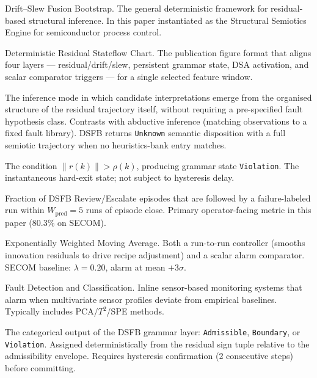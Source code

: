 \documentclass[11pt,letterpaper]{article}
\theoremstyle{scresult}
\begin{document}
\begin{description}[leftmargin=2.4cm, labelwidth=2.2cm, style=nextline,
                    itemsep=4pt, parsep=0pt]
\item[\textbf{DSFB}]
Drift--Slew Fusion Bootstrap.  The general deterministic framework for
residual-based structural inference.  In this paper instantiated as the
Structural Semiotics Engine for semiconductor process control.

\item[\textbf{DRSC}]
Deterministic Residual Stateflow Chart.  The publication figure format that
aligns four layers --- residual/drift/slew, persistent grammar state, DSA
activation, and scalar comparator triggers --- for a single selected feature
window.

\item[\textbf{Endoductive inference}]
The inference mode in which candidate interpretations emerge from the
organised structure of the residual trajectory itself, without requiring a
pre-specified fault hypothesis class.  Contrasts with abductive inference
(matching observations to a fixed fault library).  DSFB returns
\texttt{Unknown} semantic disposition with a full semiotic trajectory when no
heuristics-bank entry matches.

\item[\textbf{Envelope violation}]
The condition $\|r(k)\| > \rho(k)$, producing grammar state
\texttt{Violation}.  The instantaneous hard-exit state; not subject to
hysteresis delay.

\item[\textbf{Episode precision}]
Fraction of DSFB Review/Escalate episodes that are followed by a
failure-labeled run within $W_{\text{pred}}=5$ runs of episode close.
Primary operator-facing metric in this paper (80.3\% on SECOM).

\item[\textbf{EWMA}]
Exponentially Weighted Moving Average.  Both a run-to-run controller
(smooths innovation residuals to drive recipe adjustment) and a scalar alarm
comparator.  SECOM baseline: $\lambda=0.20$, alarm at mean $+3\sigma$.

\item[\textbf{FDC}]
Fault Detection and Classification.  Inline sensor-based monitoring systems
that alarm when multivariate sensor profiles deviate from empirical baselines.
Typically includes PCA/$T^2$/SPE methods.

\item[\textbf{Grammar state}]
The categorical output of the DSFB grammar layer:
\texttt{Admissible}, \texttt{Boundary}, or \texttt{Violation}.  Assigned
deterministically from the residual sign tuple relative to the admissibility
envelope.  Requires hysteresis confirmation (2 consecutive steps) before
committing.


\end{description}
\end{document}
